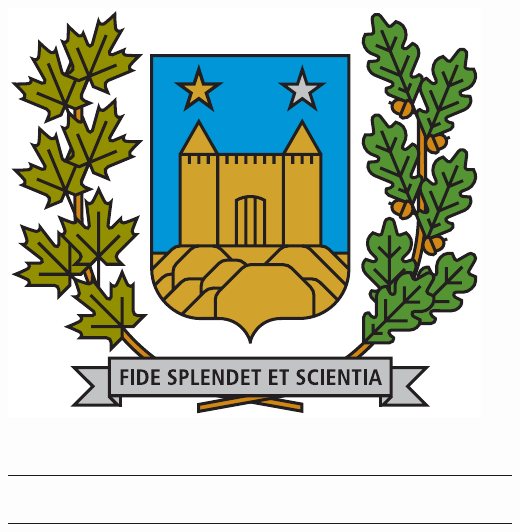 \begin{titlepage}
    \centering
    \includegraphics[scale = 1.2]{images/logo.pdf}\\[0.25cm]
    \Huge{\Faculty}\\[1.0 cm]
    \LARGE{\Course}\\
    \rule{\linewidth}{0.2 mm}\\[0.3cm]
    \LARGE{\Subject}
    \rule{\linewidth}{0.2 mm}\\[1.5 cm]
	\begin{minipage}{0.8 \textwidth}
            \centering
            \Large
            \projectName \dotfill \project\\[0.5 cm]
	    \Prof \dotfill \ProfName\\[0.5 cm]
	    \Author \dotfill \AuthorsName\\[0.5 cm]
	    \StdNo \dotfill \YourStdNo\\[0.5 cm]
	    \Date \dotfill \PubDate\\[0.5 cm]
	\end{minipage}
\end{titlepage}